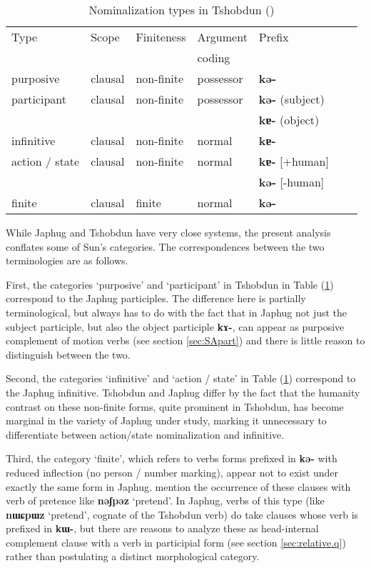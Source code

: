 \documentclass[oneside,a4paper,11pt]{article}
\newcommand{\ipa}[1]{\textbf{\phon#1}} %
\newcommand{\jpg}[2]{\ipa{#1} `#2'} %
\begin{document}
\begin{table}[H]
\caption{Nominalization types in Tshobdun (\citealt[476]{sun12complementation}) } \label{tab:tshobdun.nmlz} \centering
\begin{tabular}{lllllll}
\toprule
Type & Scope & Finiteness & Argument & Prefix \\
&&&coding \\
\midrule
purposive & clausal & non-finite& possessor & \ipa{kə-} \\
participant & clausal & non-finite& possessor & \ipa{kə-} (subject) \\
&&&& \ipa{kɐ-} (object)\\
infinitive & clausal & non-finite& normal &  \ipa{kɐ-}  \\
action / state & clausal & non-finite& normal &  \ipa{kɐ-} [+human] \\
&&&&\ipa{kə-}  [-human] \\
finite  & clausal & finite& normal &  \ipa{kə-} \\
\bottomrule
\end{tabular}
\end{table}

While Japhug and Tshobdun have very close systems, the present analysis conflates some of Sun's categories. The correspondences between the two terminologies are as follows.

First, the categories `purposive' and `participant' in Tshobdun in Table (\ref{tab:tshobdun.nmlz}) correspond to the Japhug participles. The difference here is partially terminological, but always has to do with the fact that in Japhug not just the subject participle, but also the object participle \ipa{kɤ-}, can appear as purposive complement of motion verbs (see section \ref{sec:SApart}) and there is little reason to distinguish between the two.

Second, the categories `infinitive' and `action / state' in Table (\ref{tab:tshobdun.nmlz}) correspond to the Japhug infinitive. Tshobdun and Japhug differ by the fact that the humanity contrast on these non-finite forms, quite prominent in Tshobdun, has become marginal in the variety of Japhug under study, marking it unnecessary to differentiate between action/state nominalization and infinitive.

Third, the category `finite', which refers to verbs forms prefixed in \ipa{kə-} with reduced inflection (no person / number marking), appear not to exist under exactly the same form in Japhug. \citet[481]{sun12complementation} mention the occurrence of these clauses with verb of pretence like \jpg{nəʃpəz}{pretend}. In Japhug, verbs of this type (like \jpg{nɯɕpɯz}{pretend}, cognate of the Tshobdun verb) do take clauses whose verb is prefixed in \ipa{kɯ-}, but there are reasons to analyze these as head-internal complement clause with a verb in participial form (see section \ref{sec:relative.q}) rather than postulating a distinct morphological category.
\end{document}
